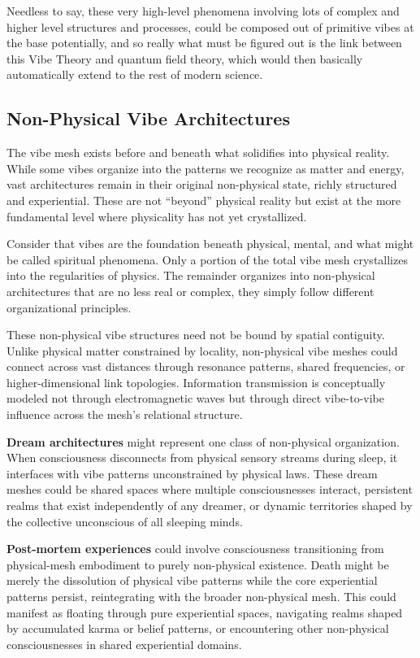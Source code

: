 Needless to say, these very high-level phenomena involving lots of complex and higher level structures and processes, could be composed out of primitive vibes at the base potentially, and so really what must be figured out is the link between this Vibe Theory and quantum field theory, which would then basically automatically extend to the rest of modern science.

\subsection{Non-Physical Vibe Architectures}

The vibe mesh exists before and beneath what solidifies into physical reality. While some vibes organize into the patterns we recognize as matter and energy, vast architectures remain in their original non-physical state, richly structured and experiential. These are not ``beyond'' physical reality but exist at the more fundamental level where physicality has not yet crystallized.

Consider that vibes are the foundation beneath physical, mental, and what might be called spiritual phenomena. Only a portion of the total vibe mesh crystallizes into the regularities of physics. The remainder organizes into non-physical architectures that are no less real or complex, they simply follow different organizational principles.

These non-physical vibe structures need not be bound by spatial contiguity. Unlike physical matter constrained by locality, non-physical vibe meshes could connect across vast distances through resonance patterns, shared frequencies, or higher-dimensional link topologies. Information transmission is conceptually modeled not through electromagnetic waves but through direct vibe-to-vibe influence across the mesh's relational structure.

\textbf{Dream architectures} might represent one class of non-physical organization. When consciousness disconnects from physical sensory streams during sleep, it interfaces with vibe patterns unconstrained by physical laws. These dream meshes could be shared spaces where multiple consciousnesses interact, persistent realms that exist independently of any dreamer, or dynamic territories shaped by the collective unconscious of all sleeping minds.

\textbf{Post-mortem experiences} could involve consciousness transitioning from physical-mesh embodiment to purely non-physical existence. Death might be merely the dissolution of physical vibe patterns while the core experiential patterns persist, reintegrating with the broader non-physical mesh. This could manifest as floating through pure experiential spaces, navigating realms shaped by accumulated karma or belief patterns, or encountering other non-physical consciousnesses in shared experiential domains.

